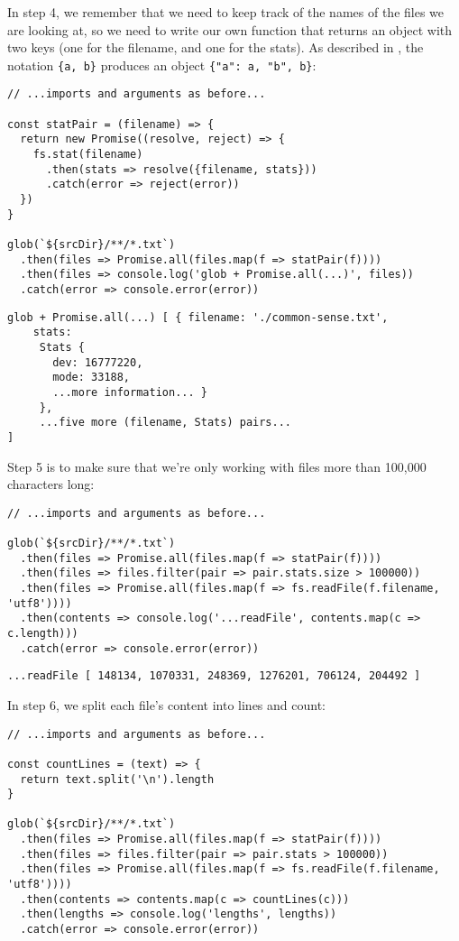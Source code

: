 In step 4,
we remember that we need to keep track of the names of the files we are looking at,
so we need to write our own function that returns an object with two keys
(one for the filename, and one for the stats).
As described in ,
the notation \texttt{\{a,\ b\}} produces an object \texttt{\{"a":\ a,\ "b",\ b\}}:

\begin{verbatim}
// ...imports and arguments as before...

const statPair = (filename) => {
  return new Promise((resolve, reject) => {
    fs.stat(filename)
      .then(stats => resolve({filename, stats}))
      .catch(error => reject(error))
  })
}

glob(`${srcDir}/**/*.txt`)
  .then(files => Promise.all(files.map(f => statPair(f))))
  .then(files => console.log('glob + Promise.all(...)', files))
  .catch(error => console.error(error))
\end{verbatim}

\begin{verbatim}
glob + Promise.all(...) [ { filename: './common-sense.txt',
    stats:
     Stats {
       dev: 16777220,
       mode: 33188,
       ...more information... }
     },
     ...five more (filename, Stats) pairs...
]
\end{verbatim}

Step 5 is to make sure that
we're only working with files more than 100,000 characters long:

\begin{verbatim}
// ...imports and arguments as before...

glob(`${srcDir}/**/*.txt`)
  .then(files => Promise.all(files.map(f => statPair(f))))
  .then(files => files.filter(pair => pair.stats.size > 100000))
  .then(files => Promise.all(files.map(f => fs.readFile(f.filename, 'utf8'))))
  .then(contents => console.log('...readFile', contents.map(c => c.length)))
  .catch(error => console.error(error))
\end{verbatim}

\begin{verbatim}
...readFile [ 148134, 1070331, 248369, 1276201, 706124, 204492 ]
\end{verbatim}

In step 6,
we split each file's content into lines and count:

\begin{verbatim}
// ...imports and arguments as before...

const countLines = (text) => {
  return text.split('\n').length
}

glob(`${srcDir}/**/*.txt`)
  .then(files => Promise.all(files.map(f => statPair(f))))
  .then(files => files.filter(pair => pair.stats > 100000))
  .then(files => Promise.all(files.map(f => fs.readFile(f.filename, 'utf8'))))
  .then(contents => contents.map(c => countLines(c)))
  .then(lengths => console.log('lengths', lengths))
  .catch(error => console.error(error))
\end{verbatim}

